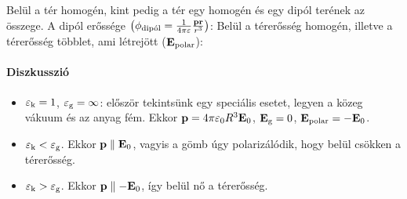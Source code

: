    Belül a tér homogén, kint pedig a tér egy homogén és egy dipól terének az összege. A dipól erőssége $\left(\phi_\text{dipól}=\frac{1}{4\pi\varepsilon}\frac{\mathbf{p}\mathbf{r}}{r^3}\right)$:
   Belül a térerősség homogén, illetve a térerősség többlet, ami létrejött ($\mathbf{E}_\text{polar}$):
   
   \paragraph{Diszkusszió} 
   \begin{itemize}
    \item $\varepsilon_\text{k}=1$, $\varepsilon_\text{g}=\infty$: először tekintsünk egy speciális esetet, legyen a közeg vákuum és az anyag fém. Ekkor $\mathbf{p}=4\pi\varepsilon_0R^3\mathbf{E}_0$, $\mathbf{E}_\text{g}=0$, $\mathbf{E}_\text{polar}=-\mathbf{E}_0$. 
    \item $\varepsilon_\text{k}<\varepsilon_\text{g}$. Ekkor $\mathbf{p} \parallel \mathbf{E}_0$, vagyis a gömb úgy polarizálódik, hogy belül csökken a térerősség.
    \item $\varepsilon_\text{k}>\varepsilon_\text{g}$. Ekkor $\mathbf{p} \parallel -\mathbf{E}_0$, így belül nő a térerősség.
   \end{itemize}
   
